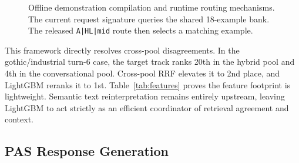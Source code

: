 \begin{figure}[t]
  \caption{Offline demonstration compilation and runtime routing mechanisms. The current request signature queries the shared 18-example bank. The released \texttt{A|HL|mid} route then selects a matching example.}
  \label{fig:demo-compiler}
\end{figure}

This framework directly resolves cross-pool disagreements. In the gothic/industrial turn-6 case, the target track ranks 20th in the hybrid pool and 4th in the conversational pool. Cross-pool RRF elevates it to 2nd place, and LightGBM reranks it to 1st. Table~\ref{tab:features} proves the feature footprint is lightweight. Semantic text reinterpretation remains entirely upstream, leaving LightGBM to act strictly as an efficient coordinator of retrieval agreement and context.

\subsection{PAS Response Generation}
\label{sec:pas_generation}


